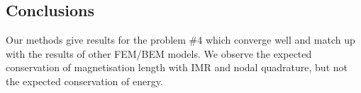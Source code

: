 \subsection{Conclusions}

Our methods give results for the \mumag problem \#4 which converge well and match up with the results of other FEM/BEM models.
We observe the expected conservation of magnetisation length with IMR and nodal quadrature, but not the expected conservation of energy.


